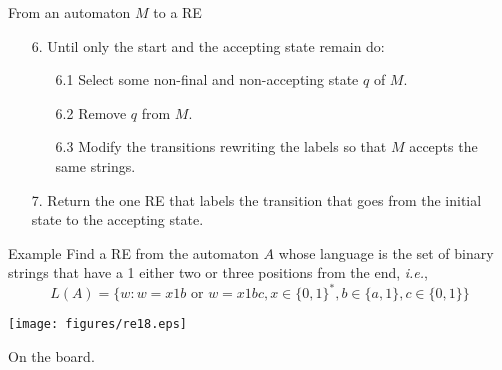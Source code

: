 \documentclass{prosper}%
\begin{document}
\begin{slide}{From an automaton $M$ to a RE}
\begin{enumerate}
\item[6.] Until only the start and the accepting state remain do:
\begin{enumerate}
\item[6.1] Select some non-final and non-accepting state $q$ of $M$.
\item[6.2] Remove $q$ from $M$.
\item[6.3] Modify the transitions rewriting the labels so that $M$ accepts the same strings.
\end{enumerate}
\item[7.] Return the one RE that labels the transition that goes from the initial state to the accepting state.
\end{enumerate}
\end{slide}

\begin{comment}
\begin{slide}{From a FA to a RE}
 For each final state $q$ obtain an equivalent automaton by eliminating from the original automaton all states except $q_0$ and $q$.
\begin{itemize}
\item If $q\neq q_0$, then we'll be left with an $A_q$ that looks like
\begin{center}
\begin{tabular}{c|c}
$A_q$ & Corresponding RE\\\hline
\texttt{[image: figures/re16.eps]} &
\(E_q = (R+SU^*T)^*SU^*\) 
\end{tabular}
\end{center}
\item If $q=q_0$, then we'll be left with $A_q$ looking like
\begin{center}
\begin{tabular}{c|c}
$A_q$ & Corresponding RE\\\hline
\texttt{[image: figures/re17.eps]} & $E_q=R^*$
\end{tabular}
\end{center}
\item The final expression is $\displaystyle\biguplus_{q\in F}E_q$

\end{itemize}
\end{slide}
\end{comment}

\begin{slide}{Example}
Find a RE from the automaton $A$ whose language is the set of binary strings that have a 1 either two or three positions from the end, {\em i.e.}, 
\[
L(A)=\{w:w=x1b\mbox{ or }w=x1bc, x\in\{0,1\}^*, b\in\{a,1\}, c\in\{0,1\}\}
\]
\begin{center}
\texttt{[image: figures/re18.eps]}
\end{center}
On the board.
\end{slide}
\end{document}
